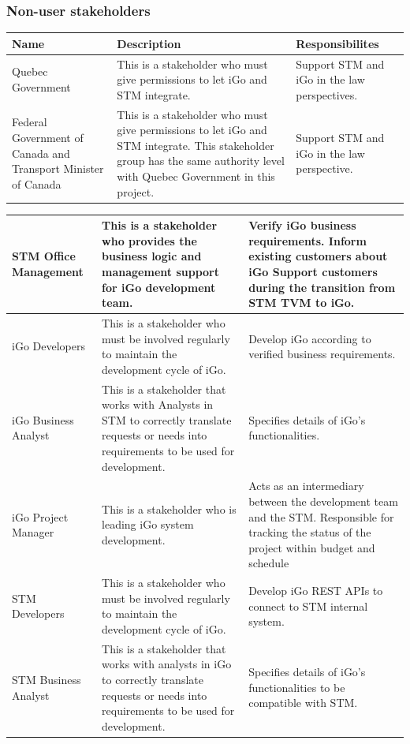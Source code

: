 \documentclass[11pt, english]{article}
\begin{document}
\subsubsection{Non-user stakeholders}
\vspace*{0.1in}
\setlength{\tabcolsep}{18pt}
\renewcommand{\arraystretch}{1.5}
\begin{tabular}{ |p{3cm}|p{7cm}|p{3cm}| }
\hline
Name & Description & Responsibilites\\
\hline

Quebec Government &
This is a stakeholder who must give permissions to let iGo and STM integrate. &
Support STM and iGo in the law perspectives.\\
\hline
Federal Government of Canada and Transport Minister of Canada &
This is a stakeholder who must give permissions to let iGo and STM integrate. This stakeholder group has the same authority level with Quebec Government in this project. &
Support STM and iGo in the law perspective.\\
\hline
\end{tabular}
\pagebreak

\setlength{\tabcolsep}{18pt}
\renewcommand{\arraystretch}{1.5}
\begin{tabular}{ |p{3cm}|p{7cm}|p{3cm}| }
\hline
STM Office Management &
This is a stakeholder who provides the business logic and management support for iGo development team. &
Verify iGo business requirements. 
Inform existing customers about iGo 
Support customers during the transition from STM TVM to iGo. \\
\hline
iGo Developers & 

This is a stakeholder who must be involved regularly to maintain  the development cycle of iGo. &
Develop iGo according to verified business requirements.\\
\hline
iGo Business Analyst &
This is a stakeholder that works with Analysts in STM to correctly translate requests or needs into requirements to be used for development. &
Specifies details of iGo’s functionalities.\\
\hline

iGo Project Manager &
This is a stakeholder who is leading iGo system development. &
Acts as an intermediary between the development team and the STM. Responsible for tracking the status of the project within budget and schedule\\
\hline
STM Developers &
This is a stakeholder who must be involved regularly to maintain  the development cycle of iGo. &
Develop iGo REST APIs to connect to STM internal system. \\
\hline
STM Business Analyst &
This is a stakeholder that works with analysts in iGo to correctly translate requests or needs into requirements to be used for development. &
Specifies details of iGo’s functionalities to be compatible with STM.\\
\hline
\end{tabular}
\pagebreak
\end{document}
